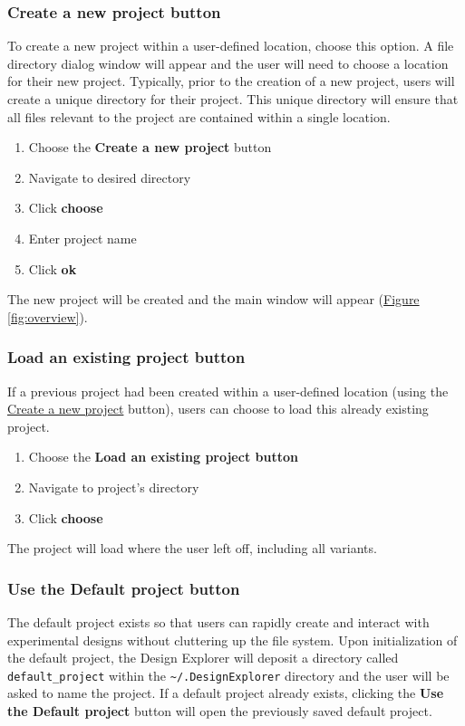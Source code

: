 \documentclass[10pt]{article}
\begin{document}
		\subsubsection*{Create a new project button}
		\label{subsubsec:new}
			To create a new project within a user-defined location, choose this option. 
			A file directory dialog window will appear and the user will need to choose a location for their new project.
			Typically, prior to the creation of a new project, users will create a unique directory for their project.
			This unique directory will ensure that all files relevant to the project are contained within a single location.
			\begin{enumerate}
				\item Choose the \textbf{Create a new project} button
				\item Navigate to desired directory
				\item Click \textbf{choose}
				\item Enter project name
				\item Click \textbf{ok}
			\end{enumerate}

			The new project will be created and the main window will appear (\hyperref[fig:overview]{Figure \ref{fig:overview}}).

		\subsubsection*{Load an existing project button}
		\label{subsubsec:load}
			If a previous project had been created within a user-defined location (using the \hyperref[subsubsec:new]{Create a new project} button), users can choose to load this already existing project.
			\begin{enumerate}
				\item Choose the \textbf{Load an existing project button}
				\item Navigate to project's directory
				\item Click \textbf{choose}
			\end{enumerate}

			The project will load where the user left off, including all variants.

		\subsubsection*{Use the Default project button}
		\label{subsec:default}
			The default project exists so that users can rapidly create and interact with experimental designs without cluttering up the file system.
			Upon initialization of the default project, the Design Explorer will deposit a directory called \texttt{default\_project} within the \texttt{\textasciitilde/.DesignExplorer} directory and the user will be asked to name the project.
			If a default project already exists, clicking the \textbf{Use the Default project} button will open the previously saved default project.
\end{document}
